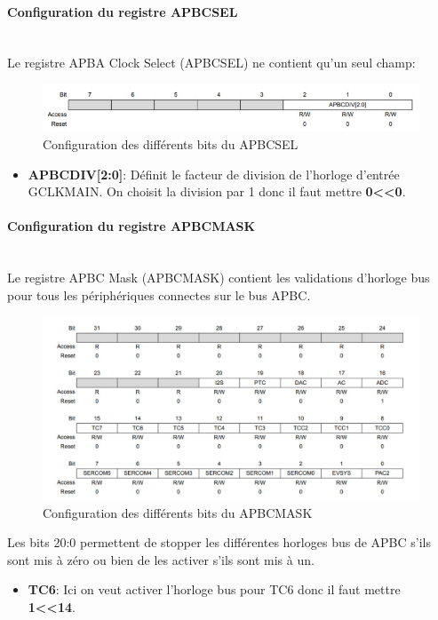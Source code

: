 \documentclass[a4paper]{article}
\begin{document}
	\paragraph{Configuration du registre APBCSEL} 
	~~\\
	Le registre APBA Clock Select (APBCSEL) ne contient qu'un seul champ:\\
	\begin{figure}[H]
		\centering
		\includegraphics[width=0.9\linewidth]{APBCSEL.jpg}
		\caption{Configuration des différents bits du APBCSEL}
	\end{figure}
	
	\begin{itemize}
		\item {\bf APBCDIV[2:0]}: Définit le facteur de division de l'horloge d'entrée GCLKMAIN. On choisit la division par 1 donc il faut mettre {\bf 0\textless\textless0}.~~\\
	\end{itemize}
	
	\paragraph{Configuration du registre APBCMASK} 
	~~\\
	Le registre APBC Mask (APBCMASK) contient les validations d'horloge bus pour tous les périphériques connectes sur le bus APBC.
	\begin{figure}[H]
		\centering
		\includegraphics[width=0.9\linewidth]{APBCMASK.jpg}
		\caption{Configuration des différents bits du APBCMASK}
	\end{figure}
	Les bits 20:0 permettent de stopper les différentes horloges bus de APBC s’ils sont mis à zéro ou bien de les activer s’ils sont mis à un.
	\begin{itemize}
		\item {\bf TC6}: Ici on veut activer l’horloge bus pour TC6 donc il faut mettre {\bf 1\textless\textless14}.~~\\
	\end{itemize}
	
\end{document}
